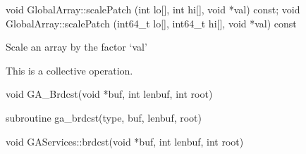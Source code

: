 \documentclass[12pt]{article}
\begin{document}
\begin{cxxapi}
\begin{cxxcode}
void GlobalArray::scalePatch (int lo[], int hi[], void *val) const;
void GlobalArray::scalePatch (int64_t lo[], int64_t hi[], void *val) const
\end{cxxcode}
\begin{funcargs}
\end{funcargs}
\end{cxxapi}

\begin{desc}

Scale an array by the factor `val'

This is a collective operation.
\end{desc}


\begin{capi}
\begin{ccode}
void GA_Brdcst(void *buf, int lenbuf, int root)
\end{ccode}
\begin{funcargs}
\end{funcargs}
\end{capi}

\begin{fapi}
\begin{fcode}
subroutine ga_brdcst(type, buf, lenbuf, root)
\end{fcode}
\begin{funcargs}
\end{funcargs}
\end{fapi}

\begin{cxxapi}
\begin{cxxcode}
void GAServices::brdcst(void *buf, int lenbuf, int root)
\end{cxxcode}
\begin{funcargs}
\end{funcargs}
\end{cxxapi}
\end{document}
